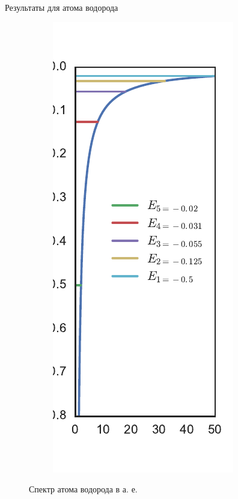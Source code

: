 \documentclass{beamer}
\begin{document}
\begin{frame}{Результаты для атома водорода}

\begin{figure}[h!]
\centering
\begin{subfigure}{.2\textwidth}
  \centering
  \includegraphics[width=1.0\linewidth]{h2_atom.pdf}
\end{subfigure}
\caption{Спектр атома водорода в а. е.}
\label{fig:h2_spectrum}

\end{figure}
\end{frame}
\end{document}
